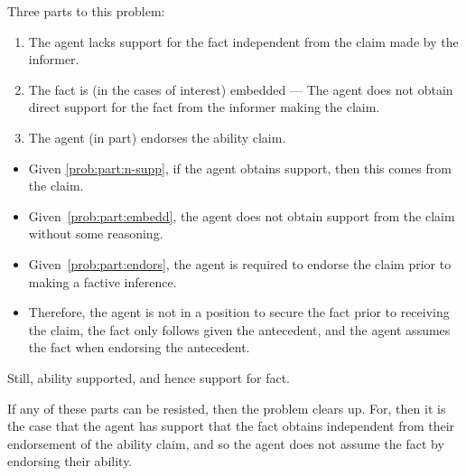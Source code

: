 \documentclass[10pt]{article}
\begin{document}
Three parts to this problem:
\begin{enumerate}[label=?\alph*., ref=(?\alph*)]
\item\label{prob:part:n-supp} The agent lacks support for the fact independent from the claim made by the informer.
\item\label{prob:part:embedd} The fact is (in the cases of interest) embedded --- The agent does not obtain direct support for the fact from the informer making the claim.
\item\label{prob:part:endors} The agent (in part) endorses the ability claim.
\end{enumerate}

\begin{itemize}
\item Given \ref{prob:part:n-supp}, if the agent obtains support, then this comes from the claim.
\item Given~\ref{prob:part:embedd}, the agent does not obtain support from the claim without some reasoning.
\item Given~\ref{prob:part:endors}, the agent is required to endorse the claim prior to making a factive inference.
\item Therefore, the agent is not in a position to secure the fact prior to receiving the claim, the fact only follows given the antecedent, and the agent assumes the fact when endorsing the antecedent.
\end{itemize}

{
  \color{red}
  Still, ability supported, and hence support for fact.
}

If any of these parts can be resisted, then the problem clears up.
For, then it is the case that the agent has support that the fact obtains independent from their endorsement of the ability claim, and so the agent does not assume the fact by endorsing their ability.
\end{document}
